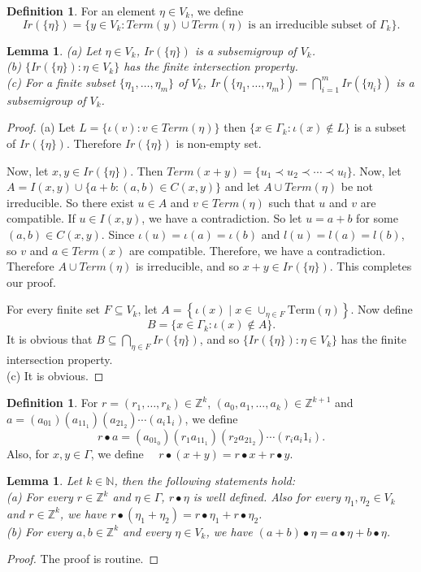 \documentclass{amsart}
\newtheorem{lemma}[theorem]{Lemma}
\theoremstyle{definition}
\newtheorem{definition}[theorem]{Definition}
\theoremstyle{remark}
\numberwithin{equation}{section}
\begin{document}
\begin{definition}
	For an element $\eta\in V_k$, we define 
	\[
	Ir(\{\eta\})=\{y\in V_k:Term(y)\cup Term(\eta)\mbox{ is an irreducible subset of }\Gamma_k\}.
	\] 
\end{definition}
\begin{lemma}{\label{366}}
	(a) Let $\eta\in V_k$, $Ir(\{\eta\})$ is a subsemigroup of $V_k$.\\ 
	(b) $\{Ir(\{\eta\}):\eta\in V_k\}$ has the finite intersection property.\\
	(c) For a finite subset $\{\eta_1,\ldots,\eta_m\}$ of $V_k$, $Ir(\{\eta_1,\ldots,\eta_m\})=\bigcap_{i=1}^mIr(\{\eta_i\})$ is a subsemigroup of $V_k$.
\end{lemma}
\begin{proof}
	(a) Let $L=\{\iota(v):v\in Term(\eta)\}$ then $\{x\in\Gamma_k:\iota(x)\notin L\}$ is a subset of $Ir(\{\eta\})$. Therefore $Ir(\{\eta\})$ is non-empty set. 
	
	Now, let $x,y\in Ir(\{\eta\})$. Then $Term(x+y)=\{u_1\prec u_2\prec\cdots\prec u_l\}$. Now, let $A=I(x,y)\cup \{a+b:(a,b)\in C(x,y)\}$ and let $A\cup Term(\eta)$ be not irreducible. So there exist $u\in A$ and $v\in Term(\eta)$ such that $u$ and $v$ are compatible. If $u\in I(x,y)$, we have a contradiction. So let $u=a+b$ for some $(a,b)\in C(x,y)$. Since $\iota(u)=\iota(a)=\iota(b)$ and $l(u)=l(a)=l(b)$, so $v$ and $a\in Term(x)$ are compatible. Therefore, we have a contradiction. Therefore $A\cup Term(\eta)$ is irreducible, and so $x+y\in Ir(\{\eta\})$. This completes our proof.\\
	\item[(b)] For every finite set $F \subseteq V_k$, let
$A = \left\{ \iota(x) \mid x \in \cup_{\eta \in F} \mathrm{Term}(\eta) \right\}.$ Now define 
	\[
	B=\{x\in\Gamma_k:\iota(x)\notin A\}.
	\] 
	It is obvious that $B\subseteq \bigcap_{\eta\in F}Ir(\{\eta\})$, and so $\{Ir(\{\eta\}):\eta\in V_k\}$ has the finite intersection property. \\
	(c) It is obvious.
\end{proof}
\begin{definition}{\label{3.6}}
	For $ r = ( r_1, \ldots, r_k)\in \mathbb{Z}^{k} $, $(a_0,a_1,\ldots,a_k) \in \mathbb{Z}^{k+1}$ and $a=(a_01)(a_11_1)(a_21_2)\cdots(a_i1_i)$, we define 
	\[
	r\bullet a=(a_01_0)(r_1a_11_1)(r_2a_21_2)\cdots(r_ia_i1_i). 
	\]
	Also, for $x,y\in \Gamma$, we define $\quad r \bullet (x+y) =r\bullet x+r\bullet y$.
\end{definition}
\begin{lemma}
	Let $k\in \mathbb{N}$, then the following statements hold:\\
	(a) For every $r\in \mathbb{Z}^k$ and $\eta\in \Gamma$, $r\bullet \eta$ is well defined. Also for every $\eta_1,\eta_2\in V_k$ and $r\in \mathbb{Z}^k$, we have $r\bullet(\eta_1+\eta_2)=r\bullet\eta_1+r\bullet\eta_2$.\\
	(b) For every  $a,b\in \mathbb{Z}^k$ and every $\eta\in V_k$, we have $(a+b)\bullet \eta=a\bullet\eta+b\bullet\eta$.
		\end{lemma}
\begin{proof}
	The proof is routine.
	\end{proof}
\end{document}
